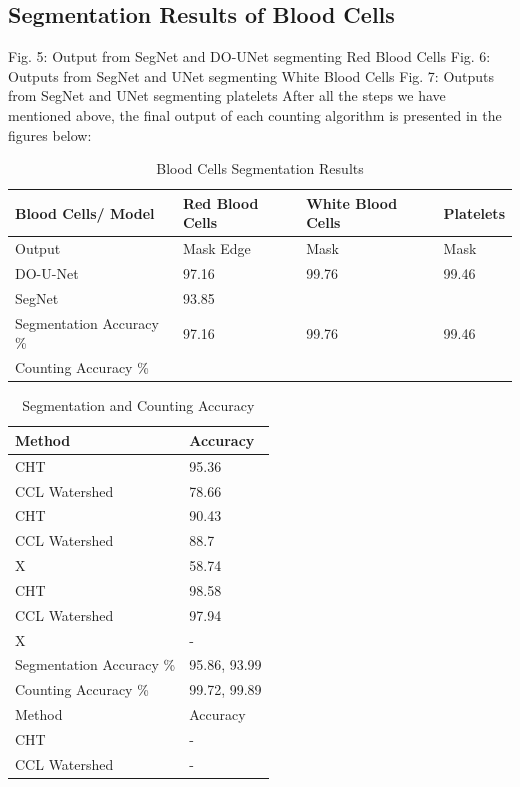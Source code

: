 \documentclass[conference]{IEEEtran}
\begin{document}
\subsection{Segmentation Results of Blood Cells}
Fig. 5: Output from SegNet and DO-UNet segmenting Red Blood Cells
Fig. 6: Outputs from SegNet and UNet segmenting White Blood Cells
Fig. 7: Outputs from SegNet and UNet segmenting platelets
After all the steps we have mentioned above, the final output of each counting algorithm is presented in the figures below:
\begin{table}[htbp]
\centering
\caption{Blood Cells Segmentation Results}
\label{tab:segmentation_results}
\begin{tabular}{llll}
Blood Cells/ Model & Red Blood Cells & White Blood Cells & Platelets \\
\hline
Output & Mask Edge & Mask & Mask \\
DO-U-Net & 97.16 & 99.76 & 99.46 \\
SegNet & 93.85 & & \\
Segmentation Accuracy \% & 97.16 & 99.76 & 99.46 \\
Counting Accuracy \% & & & 
\end{tabular}
\end{table}

\begin{table}[htbp]
\centering
\caption{Segmentation and Counting Accuracy}
\label{tab:accuracy}
\begin{tabular}{ll}
Method & Accuracy \\
\hline
CHT & 95.36 \\
CCL Watershed & 78.66 \\
CHT & 90.43 \\
CCL Watershed & 88.7 \\
X & 58.74 \\
CHT & 98.58 \\
CCL Watershed & 97.94 \\
X & - \\
\hline
Segmentation Accuracy \% & 95.86, 93.99 \\
Counting Accuracy \% & 99.72, 99.89 \\
\hline
Method & Accuracy \\
\hline
CHT & - \\
CCL Watershed & - \\
\end{tabular}
\end{table}
\end{document}

